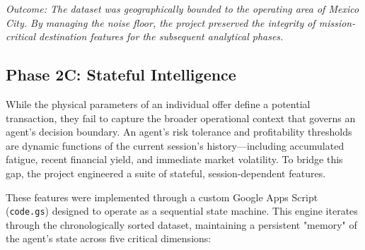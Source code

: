 \noindent \textit{Outcome: The dataset was geographically bounded to the operating area of Mexico City. By managing the noise floor, the project preserved the integrity of mission-critical destination features for the subsequent analytical phases.}


\subsection{Phase 2C: Stateful Intelligence}

While the physical parameters of an individual offer define a potential transaction, they fail to capture the broader operational context that governs an agent’s decision boundary. An agent's risk tolerance and profitability thresholds are dynamic functions of the current session's history—including accumulated fatigue, recent financial yield, and immediate market volatility. To bridge this gap, the project engineered a suite of stateful, session-dependent features.

These features were implemented through a custom Google Apps Script (\texttt{code.gs}) designed to operate as a sequential state machine. This engine iterates through the chronologically sorted dataset, maintaining a persistent "memory" of the agent's state across five critical dimensions:

